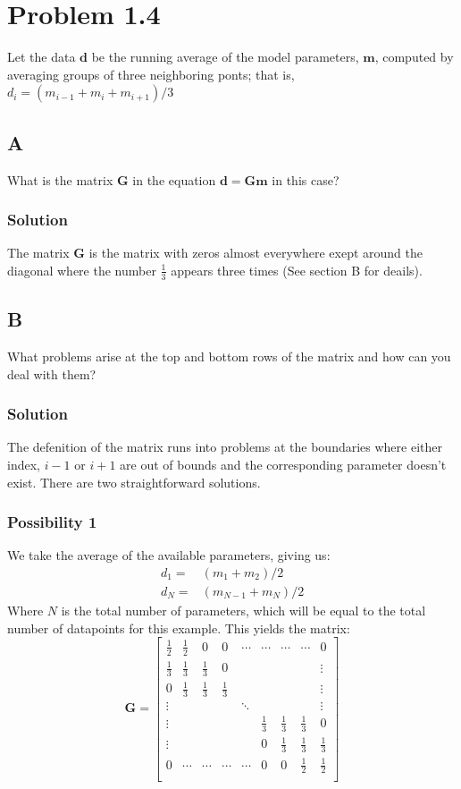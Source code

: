 \section*{Problem 1.4}
Let the data $\mathbf{d}$ be the running average of the model parameters, $\mathbf{m}$, computed by averaging groups of three neighboring ponts; that is, $d_i = (m_{i-1} + m_i + m_{i+1})/3$
\subsection*{A}
What is the matrix $\mathbf{G}$ in the equation $\mathbf{d} = \mathbf{Gm}$ in this case?
\subsubsection*{Solution}
The matrix $\mathbf{G}$ is the matrix with zeros almost everywhere exept around the diagonal where the number $\frac{1}{3}$ appears three times (See section B for deails).
\subsection*{B}
What problems arise at the top and bottom rows of the matrix and how can you deal with them?
\subsubsection*{Solution}
The defenition of the matrix runs into problems at the boundaries where either index, $i-1$ or $i+1$ are out of bounds and the corresponding parameter doesn't exist. There are two straightforward solutions.
\subsubsection*{Possibility 1}
We take the average of the available parameters, giving us: 
\begin{eqnarray*}
    d_1 =& (m_1 + m_2)/2 \\
    d_N =& (m_{N-1} + m_N)/2
\end{eqnarray*}
Where $N$ is the total number of parameters, which will be equal to the total number of datapoints for this example. This yields the matrix:
\begin{equation*}
    \mathbf{G} = 
    \begin{bmatrix}
        \frac{1}{2} & \frac{1}{2} & 0 & 0 & \cdots & \cdots & \cdots & \cdots & 0\\
        \frac{1}{3} & \frac{1}{3} & \frac{1}{3} & 0 & & & & & \vdots \\
        0 & \frac{1}{3} & \frac{1}{3} & \frac{1}{3} & & & & & \vdots \\
        \vdots & & & & \ddots & & & & \vdots \\
        \vdots & & & & & \frac{1}{3} & \frac{1}{3} & \frac{1}{3} & 0\\
        \vdots & & & & & 0 & \frac{1}{3} & \frac{1}{3} & \frac{1}{3}\\
        0 & \cdots & \cdots & \cdots & \cdots & 0 & 0 & \frac{1}{2} & \frac{1}{2}\\
    \end{bmatrix}
\end{equation*}
